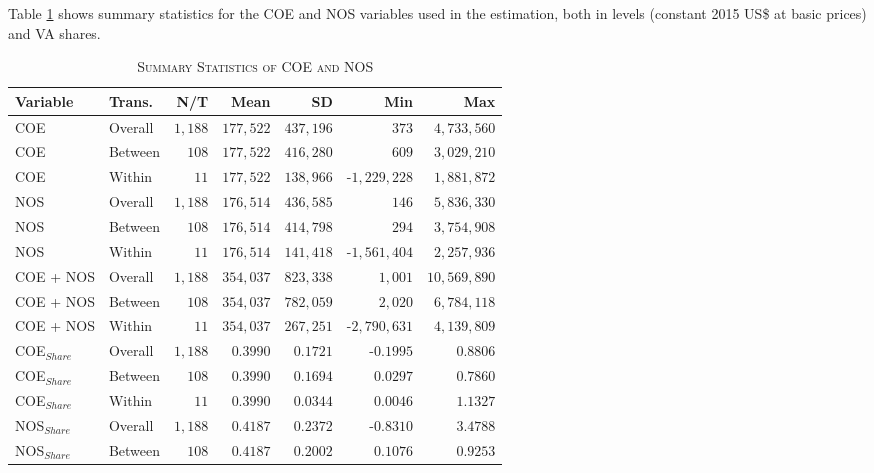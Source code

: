 \documentclass[a4paper]{article}
\begin{document}
Table \ref{tab:SUMM_VADEC} shows summary statistics for the COE and NOS variables used in the estimation, both in levels (constant 2015 US\$ at basic prices)  and VA shares. 



\begin{table}[h!] \centering 
  \caption{\label{tab:SUMM_VADEC}\textsc{Summary Statistics of COE and NOS}}
  \vspace{2mm}
\begin{tabular}{llrrrrr} \toprule
Variable & Trans. & N/T & Mean & SD & Min & Max \\ \midrule
COE & Overall & $1,188$ & $177,522$ & $437,196$ & $373$ & $4,733,560$ \\ 
COE & Between & $108$ & $177,522$ & $416,280$ & $609$ & $3,029,210$ \\ 
COE & Within & $11$ & $177,522$ & $138,966$ & -$1,229,228$ & $1,881,872$ \\ 
NOS & Overall & $1,188$ & $176,514$ & $436,585$ & $146$ & $5,836,330$ \\ 
NOS & Between & $108$ & $176,514$ & $414,798$ & $294$ & $3,754,908$ \\ 
NOS & Within & $11$ & $176,514$ & $141,418$ & -$1,561,404$ & $2,257,936$ \\ 
COE + NOS & Overall & $1,188$ & $354,037$ & $823,338$ & $1,001$ & $10,569,890$ \\ 
COE + NOS & Between & $108$ & $354,037$ & $782,059$ & $2,020$ & $6,784,118$ \\ 
COE + NOS & Within & $11$ & $354,037$ & $267,251$ & -$2,790,631$ & $4,139,809$ \\ 
COE$_{Share}$ & Overall & $1,188$ & $0.3990$ & $0.1721$ & -$0.1995$ & $0.8806$ \\ 
COE$_{Share}$ & Between & $108$ & $0.3990$ & $0.1694$ & $0.0297$ & $0.7860$ \\ 
COE$_{Share}$ & Within & $11$ & $0.3990$ & $0.0344$ & $0.0046$ & $1.1327$ \\ 
NOS$_{Share}$ & Overall & $1,188$ & $0.4187$ & $0.2372$ & -$0.8310$ & $3.4788$ \\ 
NOS$_{Share}$ & Between & $108$ & $0.4187$ & $0.2002$ & $0.1076$ & $0.9253$ \\ 

\end{tabular}
\end{table}
\end{document}
